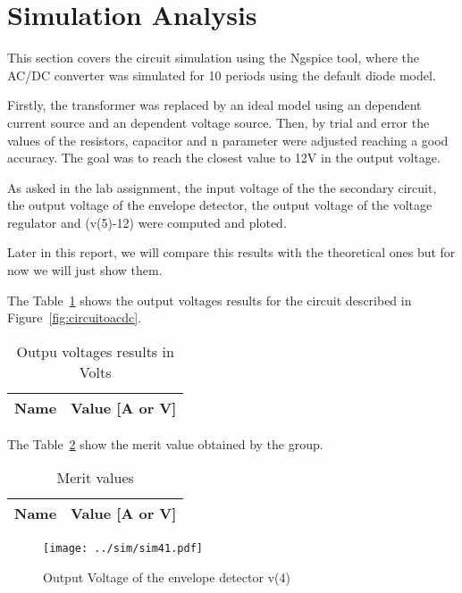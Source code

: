 \section{Simulation Analysis}
\label{sec:simulation}

\hspace{0,5cm} This section covers the circuit simulation using the Ngspice tool, where the AC/DC converter was simulated for 10 periods using the default diode model.
\par Firstly, the transformer was replaced by an ideal model using an dependent current source and an dependent voltage source. Then, by trial and error the values of the resistors, capacitor and n parameter were adjusted reaching a good accuracy. The goal was to reach the closest value to 12V in the output voltage.
\par As asked in the lab assignment, the input voltage of the the secondary circuit, the output voltage of the envelope detector, the output voltage of the voltage regulator and (v(5)-12) were computed and ploted.
\par Later in this report, we will compare this results with the theoretical ones but for now we will just show them.

The Table~\ref{tab:op1} shows the output voltages results for the circuit described in Figure~\ref{fig:circuitoacdc}.

\begin{table}[!ht]
  \centering
  \begin{tabular}{|l|r|}
    \hline    
    {\bf Name} & {\bf Value [A or V]} \\ \hline
    
  \end{tabular}
  \caption{Outpu voltages results in Volts}
  \label{tab:op1}
\end{table}

The Table~\ref{tab:op2} show the merit value obtained by the group.
\begin{table}[!ht]
  \centering
  \begin{tabular}{|l|r|}
    \hline    
    {\bf Name} & {\bf Value [A or V]} \\ \hline
    
  \end{tabular}
  \caption{Merit values}
  \label{tab:op2}
\end{table}

\begin{figure}[ht!] \centering
\texttt{[image: ../sim/sim41.pdf]}
\caption{Output Voltage of the envelope detector v(4)} 
\label{fig:sim41}
\end{figure}

